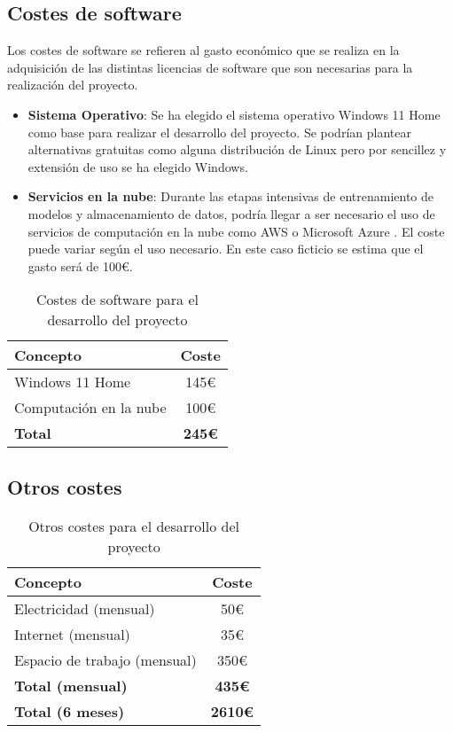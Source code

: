 \subsection{Costes de software}
Los costes de software se refieren al gasto económico que se realiza en la adquisición de las distintas licencias de software que son necesarias para la realización del proyecto.

\begin{itemize}
\tightlist
\item \textbf{Sistema Operativo}: Se ha elegido el sistema operativo Windows 11 Home como base para realizar el desarrollo del proyecto. Se podrían plantear alternativas gratuitas como alguna distribución de Linux pero por sencillez y extensión de uso se ha elegido Windows.

\item \textbf{Servicios en la nube}: Durante las etapas intensivas de entrenamiento de modelos y almacenamiento de datos, podría llegar a ser necesario el uso de servicios de computación en la nube como AWS \cite{AWS} o Microsoft Azure \cite{Kcpitt}. El coste puede variar según el uso necesario. En este caso ficticio se estima que el gasto será de 100€.
\end{itemize}

\begin{table}[h]
\centering
\begin{tabular}{|l|c|}
\hline
\textbf{Concepto} & \textbf{Coste} \\
\hline
Windows 11 Home \cite{win11} & 145€ \\
Computación en la nube & 100€ \\
\hline
\textbf{Total} & \textbf{245€} \\
\hline
\end{tabular}
\caption{Costes de software para el desarrollo del proyecto}
\end{table}

\subsection{Otros costes}

\begin{table}[h]
\centering
\begin{tabular}{|l|c|}
\hline
\textbf{Concepto} & \textbf{Coste} \\
\hline
Electricidad (mensual) & 50€ \\
Internet (mensual) & 35€ \\
Espacio de trabajo (mensual) & 350€ \\
\hline
\textbf{Total (mensual)} & \textbf{435€} \\
\hline
\textbf{Total (6 meses)} & \textbf{2610€} \\
\hline
\end{tabular}
\caption{Otros costes para el desarrollo del proyecto}
\end{table}

